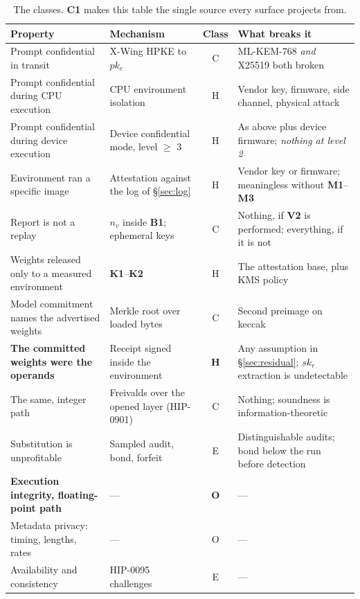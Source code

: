 \documentclass[11pt,a4paper]{article}
\newcommand{\req}[1]{\textbf{#1}}
\begin{document}
\begin{table}[ht]
\centering
\small
\begin{tabular}{@{}L{0.30\textwidth}L{0.28\textwidth}cL{0.28\textwidth}@{}}
\toprule
Property & Mechanism & Class & What breaks it \\
\midrule
Prompt confidential in transit & X-Wing HPKE to $pk_e$ & C & ML-KEM-768 \emph{and}
X25519 both broken \\
Prompt confidential during CPU execution & CPU environment isolation & H & Vendor
key, firmware, side channel, physical attack \\
Prompt confidential during device execution & Device confidential mode, level $\geq$ 3
& H & As above plus device firmware; \emph{nothing at level 2} \\
Environment ran a specific image & Attestation against the log of \S\ref{sec:log} & H
& Vendor key or firmware; meaningless without \req{M1}--\req{M3} \\
Report is not a replay & $n_v$ inside \req{B1}; ephemeral keys & C & Nothing, if
\req{V2} is performed; everything, if it is not \\
Weights released only to a measured environment & \req{K1}--\req{K2} & H & The
attestation base, plus KMS policy \\
Model commitment names the advertised weights & Merkle root over loaded bytes & C &
Second preimage on keccak \\
\textbf{The committed weights were the operands} & Receipt signed inside the
environment & \textbf{H} & Any assumption in \S\ref{sec:residual}; $sk_r$ extraction
is undetectable \\
The same, integer path & Freivalds over the opened layer (HIP-0901) & C & Nothing;
soundness is information-theoretic \\
Substitution is unprofitable & Sampled audit, bond, forfeit & E & Distinguishable
audits; bond below the run before detection \\
\textbf{Execution integrity, floating-point path} & --- & \textbf{O} & --- \\
Metadata privacy: timing, lengths, rates & --- & O & --- \\
Availability and consistency & HIP-0095 challenges & E & --- \\
\bottomrule
\end{tabular}
\caption{The classes. \req{C1} makes this table the single source every surface
projects from.}
\label{tab:class}
\end{table}
\end{document}
